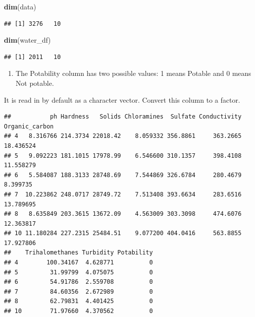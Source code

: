 \documentclass[
]{book}
\newenvironment{Shaded}{\begin{snugshade}}{\end{snugshade}}
\newcommand{\FunctionTok}[1]{\textcolor[rgb]{0.13,0.29,0.53}{\textbf{#1}}}
\newcommand{\NormalTok}[1]{#1}
\newcommand{\OtherTok}[1]{\textcolor[rgb]{0.56,0.35,0.01}{#1}}
\newcommand{\SpecialCharTok}[1]{\textcolor[rgb]{0.81,0.36,0.00}{\textbf{#1}}}
\providecommand{\tightlist}{%
  \setlength{\itemsep}{0pt}\setlength{\parskip}{0pt}}
\begin{document}
\begin{Shaded}
\begin{Highlighting}[]
\FunctionTok{dim}\NormalTok{(data)}
\end{Highlighting}
\end{Shaded}

\begin{verbatim}
## [1] 3276   10
\end{verbatim}

\begin{Shaded}
\begin{Highlighting}[]
\FunctionTok{dim}\NormalTok{(water\_df)}
\end{Highlighting}
\end{Shaded}

\begin{verbatim}
## [1] 2011   10
\end{verbatim}

\begin{enumerate}
\def\labelenumi{\arabic{enumi}.}
\setcounter{enumi}{2}
\tightlist
\item
  The Potability column has two possible values: 1 means Potable and 0 means Not potable.
\end{enumerate}

It is read in by default as a character vector. Convert this column to a factor.

\begin{Shaded}
\end{Shaded}

\begin{verbatim}
##           ph Hardness   Solids Chloramines  Sulfate Conductivity Organic_carbon
## 4   8.316766 214.3734 22018.42    8.059332 356.8861     363.2665      18.436524
## 5   9.092223 181.1015 17978.99    6.546600 310.1357     398.4108      11.558279
## 6   5.584087 188.3133 28748.69    7.544869 326.6784     280.4679       8.399735
## 7  10.223862 248.0717 28749.72    7.513408 393.6634     283.6516      13.789695
## 8   8.635849 203.3615 13672.09    4.563009 303.3098     474.6076      12.363817
## 10 11.180284 227.2315 25484.51    9.077200 404.0416     563.8855      17.927806
##    Trihalomethanes Turbidity Potability
## 4        100.34167  4.628771          0
## 5         31.99799  4.075075          0
## 6         54.91786  2.559708          0
## 7         84.60356  2.672989          0
## 8         62.79831  4.401425          0
## 10        71.97660  4.370562          0
\end{verbatim}
\end{document}
